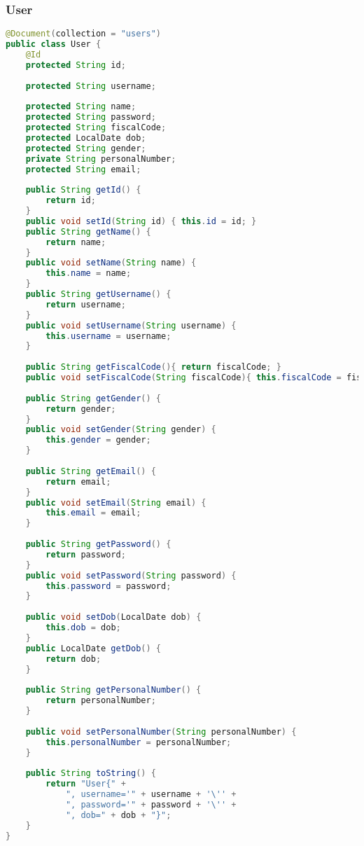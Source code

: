 \subsubsection{User}
\begin{lstlisting}[language=java]
@Document(collection = "users")
public class User {
	@Id
	protected String id;
	
	protected String username;
	
	protected String name;
	protected String password;
	protected String fiscalCode;
	protected LocalDate dob;
	protected String gender;
	private String personalNumber;
	protected String email;
	
	public String getId() {
		return id;
	}
	public void setId(String id) { this.id = id; }
	public String getName() {
		return name;
	}
	public void setName(String name) {
		this.name = name;
	}
	public String getUsername() {
		return username;
	}
	public void setUsername(String username) {
		this.username = username;
	}
	
	public String getFiscalCode(){ return fiscalCode; }
	public void setFiscalCode(String fiscalCode){ this.fiscalCode = fiscalCode; }
	
	public String getGender() {
		return gender;
	}
	public void setGender(String gender) {
		this.gender = gender;
	}
	
	public String getEmail() {
		return email;
	}
	public void setEmail(String email) {
		this.email = email;
	}
	
	public String getPassword() {
		return password;
	}
	public void setPassword(String password) {
		this.password = password;
	}
	
	public void setDob(LocalDate dob) {
		this.dob = dob;
	}
	public LocalDate getDob() {
		return dob;
	}
	
	public String getPersonalNumber() {
		return personalNumber;
	}
	
	public void setPersonalNumber(String personalNumber) {
		this.personalNumber = personalNumber;
	}
	
	public String toString() {
		return "User{" +
			", username='" + username + '\'' +
			", password='" + password + '\'' +
			", dob=" + dob + "}";
	}
}
\end{lstlisting}

